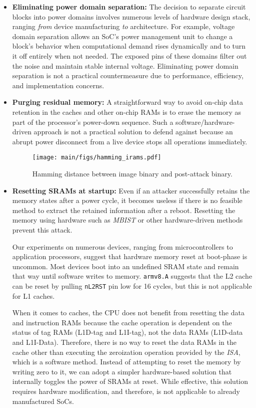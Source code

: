 \begin{itemize}
\item{\textbf{Eliminating power domain separation:}}
The decision to separate circuit blocks into power domains involves numerous levels of hardware design stack, ranging \textit{from} device manufacturing \textit{to} architecture. 
For example, voltage domain separation allows an SoC's power management unit to change a block's behavior when computational demand rises dynamically and to turn it off entirely when not needed.
The exposed pins of these domains filter out the noise and maintain stable internal voltage. 
Eliminating power domain separation is not a practical countermeasure due to performance, efficiency, and implementation concerns. 

\item{\textbf{Purging residual memory:}}
A straightforward way to avoid on-chip data retention in the caches and other on-chip RAMs is to erase the memory as part of the processor's power-down sequence. 
Such a software/hardware-driven approach is not a practical solution to defend against \sys{} because an abrupt power disconnect from a live device stops all operations immediately.
\begin{figure}
    \centering
    \texttt{[image: main/figs/hamming\_irams.pdf]}
    \caption{Hamming distance between image binary and post-attack binary.}
    \label{fig:hamming_iram}

\end{figure}

\item{\textbf{Resetting SRAMs at startup:}}
Even if an attacker successfully retains the memory states after a power cycle, it becomes useless if there is no feasible method to extract the retained information after a reboot. 
Resetting the memory using hardware such as \textit{MBIST} or other hardware-driven methods prevent this attack. 

Our experiments on numerous devices, ranging from microcontrollers to application processors, suggest that hardware memory reset at boot-phase is uncommon. 
Most devices boot into an undefined SRAM state and remain that way until software writes to memory.
\texttt{armv8.A} suggests that the L2 cache can be reset by pulling \texttt{nL2RST} pin low for 16 cycles, but this is not applicable for L1 caches. 

When it comes to caches, the CPU does not benefit from resetting the data and instruction RAMs because the cache operation is dependent on the status of tag RAMs (\eg L1D-tag and L1I-tag), not the data RAMs (\eg L1D-data and L1I-Data). 
Therefore, there is no way to reset the data RAMs in the cache other than executing the zeroization operation provided by the \textit{ISA}, which is a software method. 
Instead of attempting to reset the memory by writing zero to it, we can adopt a simpler hardware-based solution that internally toggles the power of SRAMs at reset.  
While effective, this solution requires hardware modification, and therefore, is not applicable to already manufactured SoCs.



\end{itemize}

